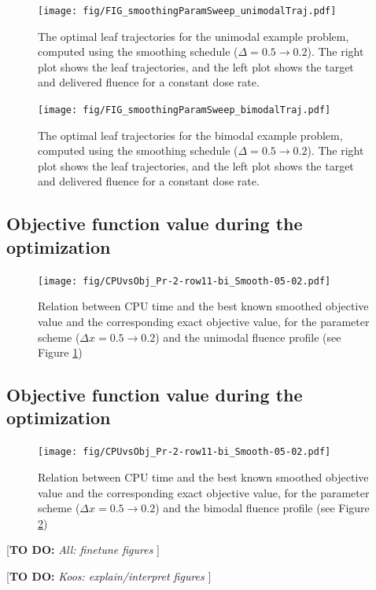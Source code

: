 \documentclass{iopart}
\newcommand{\todo}[1]{{\color{lightblue}\par {[{\bf TO DO: } {\em #1}} ] \\    }}
\begin{document}
\begin{figure}
  \centering
  \texttt{[image: fig/FIG\_smoothingParamSweep\_unimodalTraj.pdf]}
  \caption{The optimal leaf trajectories for the unimodal example problem, computed using the smoothing schedule ($\Delta = 0.5 \to 0.2$). The right plot shows the leaf trajectories, and the left plot shows the target and delivered fluence for a constant dose rate.}
  \label{fig:smoothingParamSweep_unimodalTraj}
\end{figure}


\begin{figure}
  \centering
  \texttt{[image: fig/FIG\_smoothingParamSweep\_bimodalTraj.pdf]}
  \caption{The optimal leaf trajectories for the bimodal example problem, computed using the smoothing schedule ($\Delta = 0.5 \to 0.2$). The right plot shows the leaf trajectories, and the left plot shows the target and delivered fluence for a constant dose rate.}
  \label{fig:smoothingParamSweep_bimodalTraj}
\end{figure}

\subsection{Objective function value during the optimization}
\begin{figure}
  \centering
  \texttt{[image: fig/CPUvsObj\_Pr-2-row11-bi\_Smooth-05-02.pdf]}
  \caption{Relation between CPU time and the best known smoothed objective value and the corresponding exact objective value, for the parameter scheme ($\Delta x= 0.5 \to 0.2$) and the unimodal fluence profile (see Figure \ref{fig:smoothingParamSweep_unimodalTraj})}
  \label{fig:CPUvsObj_bestalpha_uni}
\end{figure}

\subsection{Objective function value during the optimization}
\begin{figure}
  \centering
  \texttt{[image: fig/CPUvsObj\_Pr-2-row11-bi\_Smooth-05-02.pdf]}
  \caption{Relation between CPU time and the best known smoothed objective value and the corresponding exact objective value, for the parameter scheme ($\Delta x= 0.5 \to 0.2$) and the bimodal fluence profile (see Figure \ref{fig:smoothingParamSweep_bimodalTraj})}
  \label{fig:CPUvsObj_bestalpha_bi}
\end{figure}

\todo{All: finetune figures}
\todo{Koos: explain/interpret figures}
\end{document}
